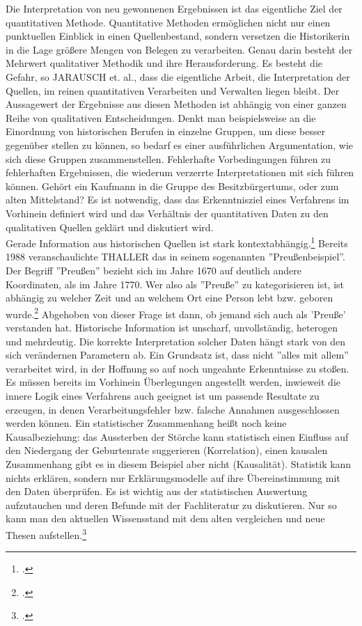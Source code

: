 \documentclass[12pt,a4paper]{article}
\begin{document}
Die Interpretation von neu gewonnenen Ergebnissen ist das eigentliche Ziel der quantitativen Methode. Quantitative Methoden ermöglichen nicht nur einen punktuellen Einblick in einen Quellenbestand, sondern versetzen die Historikerin in die Lage größere Mengen von Belegen zu verarbeiten. Genau darin besteht der Mehrwert qualitativer Methodik und ihre Herausforderung. Es besteht die Gefahr, so JARAUSCH et. al., dass die eigentliche Arbeit, die Interpretation der Quellen, im reinen quantitativen Verarbeiten und Verwalten liegen bleibt. Der Aussagewert der Ergebnisse aus diesen Methoden ist abhängig von einer ganzen Reihe von qualitativen Entscheidungen. Denkt man beispielsweise an die Einordnung von historischen Berufen in einzelne Gruppen, um diese besser gegenüber stellen zu können, so bedarf es einer ausführlichen Argumentation, wie sich diese Gruppen zusammenstellen. Fehlerhafte  Vorbedingungen führen zu fehlerhaften Ergebnissen, die wiederum verzerrte Interpretationen mit sich führen können. Gehört ein Kaufmann in die Gruppe des Besitzbürgertums, oder zum alten Mittelstand? Es ist notwendig, dass das Erkenntnisziel eines Verfahrens im Vorhinein definiert wird und das Verhältnis der quantitativen Daten zu den qualitativen Quellen geklärt und diskutiert wird.
\\
Gerade Information aus historischen Quellen ist stark kontextabhängig.\footcite[][S.182-193]{jarausch1985quantitative} Bereits 1988 veranschaulichte THALLER das in seinem sogenannten ''Preußenbeispiel''. Der Begriff ''Preußen'' bezieht sich im Jahre 1670 auf deutlich andere Koordinaten, als im Jahre 1770. Wer also als ''Preuße'' zu kategorisieren ist, ist abhängig zu welcher Zeit und an welchem Ort eine Person lebt bzw. geboren wurde.\footcite[][S.264-266]{thaller2017historical} Abgehoben von dieser Frage ist dann, ob jemand sich auch als 'Preuße' verstanden hat. Historische Information ist unscharf, unvollständig, heterogen und mehrdeutig. Die korrekte Interpretation solcher Daten hängt stark von den sich verändernen Parametern ab.
Ein Grundsatz ist, dass nicht ''alles mit allem'' verarbeitet wird, in der Hoffnung so auf noch ungeahnte Erkenntnisse zu stoßen. Es müssen bereits im Vorhinein Überlegungen angestellt werden, inwieweit die innere Logik eines Verfahrens auch geeignet ist um passende Resultate zu erzeugen, in denen Verarbeitungsfehler bzw. falsche Annahmen ausgeschlossen werden können. Ein statistischer Zusammenhang heißt noch keine Kausalbeziehung: das Aussterben der Störche kann statistisch einen Einfluss auf den Niedergang der Geburtenrate suggerieren (Korrelation), einen kausalen Zusammenhang gibt es in diesem Beispiel aber nicht (Kausalität). Statistik kann nichts erklären, sondern nur Erklärungsmodelle auf ihre Übereinstimmung mit den Daten überprüfen. Es ist wichtig aus der statistischen Auswertung aufzutauchen und deren Befunde mit der Fachliteratur zu diskutieren. Nur so kann man den aktuellen Wissensstand mit dem alten vergleichen und neue Thesen aufstellen.\footcite[][S.182-191]{jarausch1985quantitative}
\end{document}
